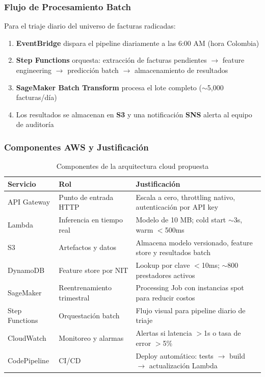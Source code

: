 \documentclass[12pt,letterpaper]{report}
\begin{document}
\subsubsection{Flujo de Procesamiento Batch}

Para el triaje diario del universo de facturas radicadas:

\begin{enumerate}
    \item \textbf{EventBridge} dispara el pipeline diariamente a las 6:00 AM (hora Colombia)
    \item \textbf{Step Functions} orquesta: extracción de facturas pendientes $\rightarrow$ feature engineering $\rightarrow$ predicción batch $\rightarrow$ almacenamiento de resultados
    \item \textbf{SageMaker Batch Transform} procesa el lote completo ($\sim$5,000 facturas/día)
    \item Los resultados se almacenan en \textbf{S3} y una notificación \textbf{SNS} alerta al equipo de auditoría
\end{enumerate}

\subsubsection{Componentes AWS y Justificación}

\begin{table}[H]
\centering
\caption{Componentes de la arquitectura cloud propuesta}
\label{tab:aws_componentes}
\small
\begin{tabular}{@{}llp{6.5cm}@{}}
\toprule
\textbf{Servicio} & \textbf{Rol} & \textbf{Justificación} \\
\midrule
API Gateway & Punto de entrada HTTP & Escala a cero, throttling nativo, autenticación por API key \\
Lambda & Inferencia en tiempo real & Modelo de 10 MB; cold start $\sim$3s, warm $<$500ms \\
S3 & Artefactos y datos & Almacena modelo versionado, feature store y resultados batch \\
DynamoDB & Feature store por NIT & Lookup por clave $<$10ms; $\sim$800 prestadores activos \\
SageMaker & Reentrenamiento trimestral & Processing Job con instancias spot para reducir costos \\
Step Functions & Orquestación batch & Flujo visual para pipeline diario de triaje \\
CloudWatch & Monitoreo y alarmas & Alertas si latencia $>$1s o tasa de error $>$5\% \\
CodePipeline & CI/CD & Deploy automático: tests $\rightarrow$ build $\rightarrow$ actualización Lambda \\
\bottomrule
\end{tabular}
\end{table}
\end{document}
